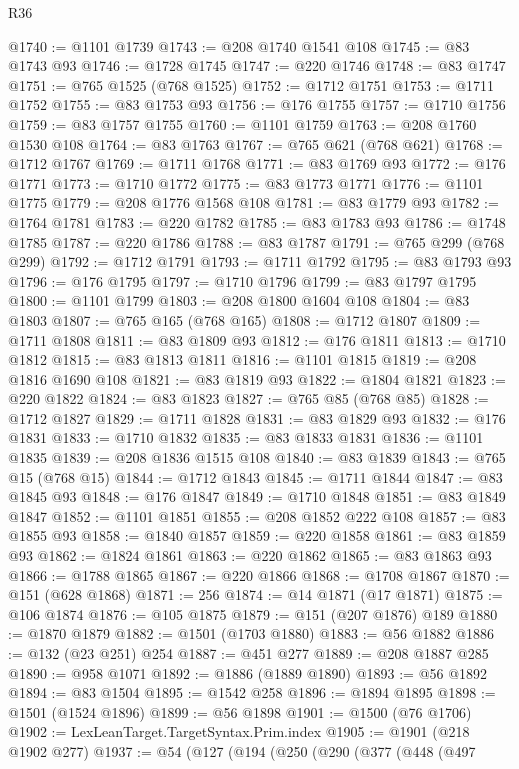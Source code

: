 \begin{lexlean}{R36}
\begin{coremodule}
@1740 := @1101 @1739
@1743 := @208 @1740 @1541 @108
@1745 := @83 @1743 @93
@1746 := @1728 @1745
@1747 := @220 @1746
@1748 := @83 @1747
@1751 := @765 @1525 (@768 @1525)
@1752 := @1712 @1751
@1753 := @1711 @1752
@1755 := @83 @1753 @93
@1756 := @176 @1755
@1757 := @1710 @1756
@1759 := @83 @1757 @1755
@1760 := @1101 @1759
@1763 := @208 @1760 @1530 @108
@1764 := @83 @1763
@1767 := @765 @621 (@768 @621)
@1768 := @1712 @1767
@1769 := @1711 @1768
@1771 := @83 @1769 @93
@1772 := @176 @1771
@1773 := @1710 @1772
@1775 := @83 @1773 @1771
@1776 := @1101 @1775
@1779 := @208 @1776 @1568 @108
@1781 := @83 @1779 @93
@1782 := @1764 @1781
@1783 := @220 @1782
@1785 := @83 @1783 @93
@1786 := @1748 @1785
@1787 := @220 @1786
@1788 := @83 @1787
@1791 := @765 @299 (@768 @299)
@1792 := @1712 @1791
@1793 := @1711 @1792
@1795 := @83 @1793 @93
@1796 := @176 @1795
@1797 := @1710 @1796
@1799 := @83 @1797 @1795
@1800 := @1101 @1799
@1803 := @208 @1800 @1604 @108
@1804 := @83 @1803
@1807 := @765 @165 (@768 @165)
@1808 := @1712 @1807
@1809 := @1711 @1808
@1811 := @83 @1809 @93
@1812 := @176 @1811
@1813 := @1710 @1812
@1815 := @83 @1813 @1811
@1816 := @1101 @1815
@1819 := @208 @1816 @1690 @108
@1821 := @83 @1819 @93
@1822 := @1804 @1821
@1823 := @220 @1822
@1824 := @83 @1823
@1827 := @765 @85 (@768 @85)
@1828 := @1712 @1827
@1829 := @1711 @1828
@1831 := @83 @1829 @93
@1832 := @176 @1831
@1833 := @1710 @1832
@1835 := @83 @1833 @1831
@1836 := @1101 @1835
@1839 := @208 @1836 @1515 @108
@1840 := @83 @1839
@1843 := @765 @15 (@768 @15)
@1844 := @1712 @1843
@1845 := @1711 @1844
@1847 := @83 @1845 @93
@1848 := @176 @1847
@1849 := @1710 @1848
@1851 := @83 @1849 @1847
@1852 := @1101 @1851
@1855 := @208 @1852 @222 @108
@1857 := @83 @1855 @93
@1858 := @1840 @1857
@1859 := @220 @1858
@1861 := @83 @1859 @93
@1862 := @1824 @1861
@1863 := @220 @1862
@1865 := @83 @1863 @93
@1866 := @1788 @1865
@1867 := @220 @1866
@1868 := @1708 @1867
@1870 := @151 (@628 @1868)
@1871 := 256
@1874 := @14 @1871 (@17 @1871)
@1875 := @106 @1874
@1876 := @105 @1875
@1879 := @151 (@207 @1876) @189
@1880 := @1870 @1879
@1882 := @1501 (@1703 @1880)
@1883 := @56 @1882
@1886 := @132 (@23 @251) @254
@1887 := @451 @277
@1889 := @208 @1887 @285
@1890 := @958 @1071
@1892 := @1886 (@1889 @1890)
@1893 := @56 @1892
@1894 := @83 @1504
@1895 := @1542 @258
@1896 := @1894 @1895
@1898 := @1501 (@1524 @1896)
@1899 := @56 @1898
@1901 := @1500 (@76 @1706)
@1902 := LexLeanTarget.TargetSyntax.Prim.index
@1905 := @1901 (@218 @1902 @277)
@1937 := @54
    (@127
      (@194
        (@250
          (@290
            (@377
              (@448
                (@497

\end{coremodule}
\end{lexlean}
